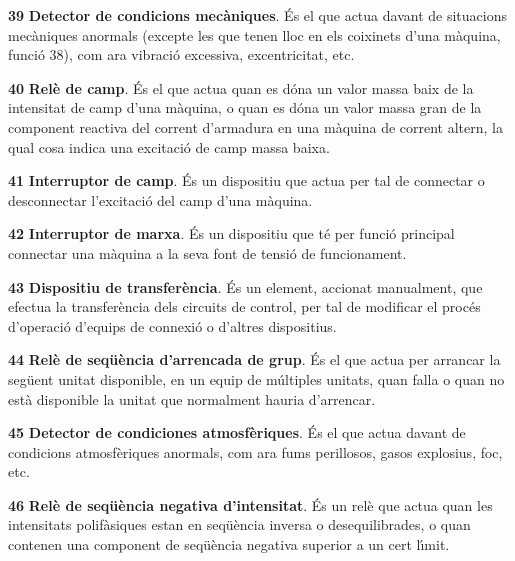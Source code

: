 \begin{multicols}{2}
\begin{list}{}
\item[\textbf{39}] 
\textbf{Detector de condicions mec\`{a}niques}. \'{E}s el que actua davant
de situacions mec\`{a}niques anormals (excepte les que tenen lloc en els
coixinets d'una m\`{a}quina, funci\'{o} 38), com ara vibraci\'{o} excessiva,
excentricitat, etc.

\item[\textbf{40}]  \textbf{Rel\`{e} de camp}. \'{E}s el que actua quan es
d\'{o}na un valor massa baix de la intensitat de camp d'una m\`{a}quina, o quan es d\'{o}na un valor
massa gran de la component reactiva del corrent d'armadura en una m\`{a}quina de corrent
altern, la qual cosa indica una excitaci\'{o} de camp massa baixa.

\item[\textbf{41}]  \textbf{Interruptor de camp}. \'{E}s un dispositiu
que actua per tal de connectar o desconnectar l'excitaci\'{o} del camp
d'una m\`{a}quina.

\item[\textbf{42}]  \textbf{Interruptor de marxa}. \'{E}s un
dispositiu que t\'{e} per funci\'{o} principal connectar una m\`{a}quina a la
seva font de tensi\'{o} de funcionament.

\item[\textbf{43}]  \textbf{Dispositiu de transfer\`{e}ncia}. \'{E}s
un element, accionat manualment, que efectua la transfer\`{e}ncia dels circuits de control, per tal
 de modificar el proc\'{e}s d'operaci\'{o} d'equips de connexi\'{o} o d'altres dispositius.

\item[\textbf{44}]  \textbf{Rel\`{e} de seq\"{u}\`{e}ncia
d'arrencada de grup}. \'{E}s el que actua per arrancar la seg\"{u}ent unitat
disponible, en un equip de m\'{u}ltiples unitats, quan falla o quan no
est\`{a} disponible la unitat que normalment hauria d'arrencar.

\item[\textbf{45}]  \textbf{Detector de condiciones
atmosf\`{e}riques}. \'{E}s el que actua davant de condicions atmosf\`{e}riques anormals, com ara fums
perillosos, gasos explosius, foc, etc.

\item[\textbf{46}]  \textbf{Rel\`{e} de
seq\"{u}\`{e}ncia negativa d'intensitat}. \'{E}s un rel\`{e} que actua quan les
intensitats polif\`{a}siques estan en seq\"{u}\`{e}ncia inversa o
desequilibrades, o quan contenen una component de seq\"{u}\`{e}ncia negativa
superior a un cert l\'{\i}mit.


\end{list}
\end{multicols}
